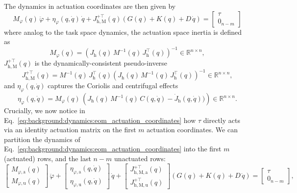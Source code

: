The dynamics in actuation coordinates are then given by
\begin{equation}
    M_\varphi(q) \, \ddot{\varphi} + \eta_\varphi(q,\dot{q}) \, \dot{q} + J_{\mathrm{h},\mathrm{M}}^{+\top}(q) \left ( G(q) + K(q) + D \, \dot{q} \right ) = \begin{bmatrix}
        \tau\\ 0_{n-m}
    \end{bmatrix}
\end{equation}
where analog to the task space dynamics, the actuation space inertia is defined as~\citep{khatib1987unified}
\begin{equation}\label{eq:background:dynamics:eom_actuation_coordinates}
    M_\varphi(q) = \left ( J_\mathrm{h}(q) \, M^{-1}(q) \, J_\mathrm{h}^\top(q) \right )^{-1} \in \mathbb{R}^{n \times n},
\end{equation}
$J_{\mathrm{h},\mathrm{M}}^{+\top}(q)$ is the dynamically-consistent pseudo-inverse~\citep{chang1995manipulator}
\begin{equation}
    J_{\mathrm{h},\mathrm{M}}^{+\top}(q) = M^{-1}(q) \, J_\mathrm{h}^\top(q) \left ( J_\mathrm{h}(q) \, M^{-1}(q) \, J_\mathrm{h}^\top(q) \right )^{-1} \in \mathbb{R}^{n \times n},
\end{equation}
and $\eta_\varphi(q,\dot{q})$ captures the Coriolis and centrifugal effects
\begin{equation}
    \eta_\varphi(q, \dot{q}) = M_\varphi(q) \, \left ( J_\mathrm{h}(q) \, M^{-1}(q) \, C(q,\dot{q}) - \dot{J}_\mathrm{h}(q,\dot{q})) \right ) \in \mathbb{R}^{n \times n}.
\end{equation}
Crucially, we now notice in Eq.~\ref{eq:background:dynamics:eom_actuation_coordinates} how $\tau$ directly acts via an identity actuation matrix on the first $m$ actuation coordinates.
%
We can partition the dynamics of Eq.~\ref{eq:background:dynamics:eom_actuation_coordinates} into the first $m$ (actuated) rows, and the last $n-m$ unactuated rows:
\begin{equation}
    \begin{bmatrix}
        M_{\varphi,\mathrm{a}}(q)\\ M_{\varphi,\mathrm{u}}(q)
    \end{bmatrix} \, \ddot{\varphi} + \begin{bmatrix}
        \eta_{\varphi,\mathrm{a}}(q,\dot{q})\\ \eta_{\varphi,\mathrm{u}}(q,\dot{q})
    \end{bmatrix} \, \dot{q} + \begin{bmatrix}
        J_{\mathrm{h},\mathrm{M},\mathrm{a}}^{+\top}(q)\\
        J_{\mathrm{h},\mathrm{M},\mathrm{u}}^{+\top}(q)
    \end{bmatrix} \left ( G(q) + K(q) + D \, \dot{q} \right ) = \begin{bmatrix}
        \tau\\ 0_{n-m}
    \end{bmatrix},
\end{equation}
